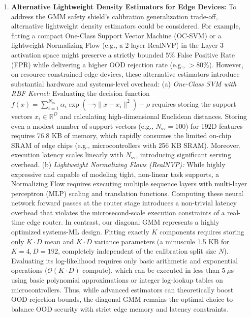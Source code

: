 \begin{enumerate}
    \item \textbf{Alternative Lightweight Density Estimators for Edge Devices:} To address the GMM safety shield's calibration generalization trade-off, alternative lightweight density estimators could be considered. For example, fitting a compact One-Class Support Vector Machine (OC-SVM) or a lightweight Normalizing Flow (e.g., a 2-layer RealNVP) in the Layer 3 activation space might preserve a strictly bounded 5\% False Positive Rate (FPR) while delivering a higher OOD rejection rate (e.g., $>80\%$). However, on resource-constrained edge devices, these alternative estimators introduce substantial hardware and systems-level overhead: (a) \emph{One-Class SVM with RBF Kernel:} Evaluating the decision function $f(x) = \sum_{i=1}^{N_{\text{sv}}} \alpha_i \exp(-\gamma \|x - x_i\|^2) - \rho$ requires storing the support vectors $x_i \in \mathbb{R}^D$ and calculating high-dimensional Euclidean distances. Storing even a modest number of support vectors (e.g., $N_{\text{sv}} = 100$) for 192D features requires 76.8 KB of memory, which rapidly consumes the limited on-chip SRAM of edge chips (e.g., microcontrollers with 256 KB SRAM). Moreover, execution latency scales linearly with $N_{\text{sv}}$, introducing significant serving overhead. (b) \emph{Lightweight Normalizing Flows (RealNVP):} While highly expressive and capable of modeling tight, non-linear task supports, a Normalizing Flow requires executing multiple sequence layers with multi-layer perceptron (MLP) scaling and translation functions. Computing these neural network forward passes at the router stage introduces a non-trivial latency overhead that violates the microsecond-scale execution constraints of a real-time edge router. In contrast, our diagonal GMM represents a highly optimized systems-ML design. Fitting exactly $K$ components requires storing only $K \cdot D$ mean and $K \cdot D$ variance parameters (a minuscule 1.5 KB for $K=4, D=192$, completely independent of the calibration split size $N$). Evaluating its log-likelihood requires only basic arithmetic and exponential operations ($\mathcal{O}(K \cdot D)$ compute), which can be executed in less than $5\ \mu$s using basic polynomial approximations or integer log-lookup tables on microcontrollers. Thus, while advanced estimators can theoretically boost OOD rejection bounds, the diagonal GMM remains the optimal choice to balance OOD security with strict edge memory and latency constraints.

\end{enumerate}
